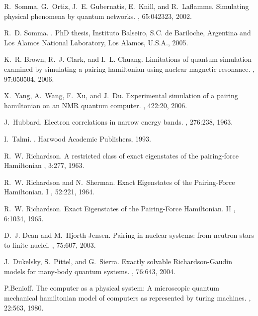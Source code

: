 \documentclass[aps,pra,twocolumn,floatfix]{revtex4}
\begin{document}
\begin{thebibliography}{100}
R.~Somma, G.~Ortiz, J.~E. Gubernatis, E.~Knill, and R.~Laflamme.
\newblock Simulating physical phenomena by quantum networks.
, 65:042323, 2002.

R.~D. Somma.
.
\newblock PhD thesis, Instituto Balseiro, S.C. de Bariloche, Argentina and Los
  Alamos National Laboratory, Los Alamos, U.S.A., 2005.

K.~R. Brown, R.~J. Clark, and I.~L. Chuang.
\newblock Limitations of quantum simulation examined by simulating a pairing
  hamiltonian using nuclear magnetic resonance.
, 97:050504, 2006.

X.~Yang, A.~Wang, F.~Xu, and J.~Du.
\newblock Experimental simulation of a pairing hamiltonian on an NMR quantum
  computer.
, 422:20, 2006.

J.~Hubbard.
\newblock Electron correlations in narrow energy bands.
, 276:238, 1963.

I.~Talmi.
.
\newblock Harwood Academic Publishers, 1993.

R.~W. Richardson.
\newblock   A restricted class of exact eigenstates of the pairing-force Hamiltonian
, 3:277, 1963.


R.~W. Richardson and N.~Sherman.
\newblock  Exact Eigenstates of the Pairing-Force Hamiltonian. I
, 52:221, 1964.


R.~W. Richardson.
\newblock  Exact Eigenstates of the Pairing-Force Hamiltonian. II 
, 6:1034, 1965.

D.~J. Dean and M.~Hjorth-Jensen.
\newblock Pairing in nuclear systems: from neutron stars to finite nuclei.
, 75:607, 2003.

J.~Dukelsky, S.~Pittel, and G.~Sierra.
\newblock Exactly solvable Richardson-Gaudin models for many-body
  quantum systems.
, 76:643, 2004.

P.Benioff.
\newblock The computer as a physical system: A microscopic quantum mechanical
  hamiltonian model of computers as represented by turing machines.
, 22:563, 1980.


\end{thebibliography}
\end{document}
